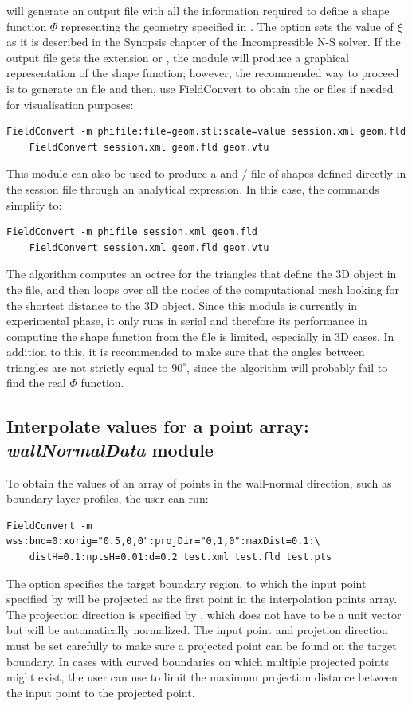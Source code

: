 will generate an output file  with all the information required
to define a shape function $\Phi$ representing the geometry specified in
. The option  sets the value of $\xi$ as it is
described in the Synopsis chapter of the Incompressible N-S solver. If the
output file gets the extension  or , the module will
produce a graphical representation of the shape function; however, the
recommended way to proceed is to generate an  file and then, use
FieldConvert to obtain the  or  files if needed for
visualisation purposes:
\begin{lstlisting}[style=BashInputStyle]
    FieldConvert -m phifile:file=geom.stl:scale=value session.xml geom.fld
    FieldConvert session.xml geom.fld geom.vtu
\end{lstlisting}
This module can also be used to produce a  and  /
 file of shapes defined directly in the session file through an
analytical expression. In this case, the commands simplify to:
\begin{lstlisting}[style=BashInputStyle]
    FieldConvert -m phifile session.xml geom.fld
    FieldConvert session.xml geom.fld geom.vtu
\end{lstlisting}

The algorithm computes an octree for the triangles that define the 3D object
in the  file, and then loops over all the nodes of the
computational mesh looking for the shortest distance to the 3D object. Since
this module is currently in experimental phase, it only runs in serial and
therefore its performance in computing the shape function from the 
file is limited, especially in 3D cases. In addition to this, it is recommended
to make sure that the angles between triangles are not strictly equal to
$90^\circ$, since the algorithm will probably fail to find the real $\Phi$
function.
%
%
%

\subsection{Interpolate values for a point array: 
\textit{wallNormalData} module}
To obtain the values of an array of points in the wall-normal direction, such 
as boundary layer profiles, the user can run:
\begin{lstlisting}[style=BashInputStyle]
FieldConvert -m wss:bnd=0:xorig="0.5,0,0":projDir="0,1,0":maxDist=0.1:\
    distH=0.1:nptsH=0.01:d=0.2 test.xml test.fld test.pts
\end{lstlisting}
The option  specifies the target boundary region, to which the input 
point specified by \inltt{xorig} will be projected as the first point in 
the interpolation points array. The projection direction is specified by 
\inltt{projDir}, which does not have to be a unit vector but will be 
automatically normalized. The input point and projetion direction must be set 
carefully to make sure a projected point can be found on the target boundary. 
In cases with curved boundaries on which multiple projected points might exist, 
the user can use \inltt{maxDist} to limit the maximum projection distance 
between the input point to the projected point.


